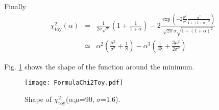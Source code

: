 Finally
\begin{equation}
\begin{array}{lcl}
\chi^2_{\text{toy}}(\alpha) &=& \frac{1}{2\sigma\sqrt{\pi}}(1 + \frac{1}{1+\alpha} ) -2   \frac{\exp\left(-2 \frac{\mu^2}{\sigma^2} \frac{\alpha^2}{1+(1+\alpha)^2}\right)}{\sqrt{2\pi}\sigma\sqrt{1+(1+\alpha)^2}}  \\
&\simeq & \alpha^2( \frac{\mu^2}{\sigma^2} + \frac{1}{8}) - \alpha^3 ( \frac{1}{48} + \frac{3\mu^2}{2\sigma^2})
\end{array}
\end{equation}


Fig. \ref{fig:orgda84955} shows the shape of the function around the minimum.

\begin{figure}[htbp]
\centering
\texttt{[image: FormulaChi2Toy.pdf]}
\caption{\label{fig:orgda84955}
Shape of \(\chi^{\text{2}}_{\text{toy}}\)(\(\alpha\);\(\mu\)=90, \(\sigma\)=1.6).}
\end{figure}
